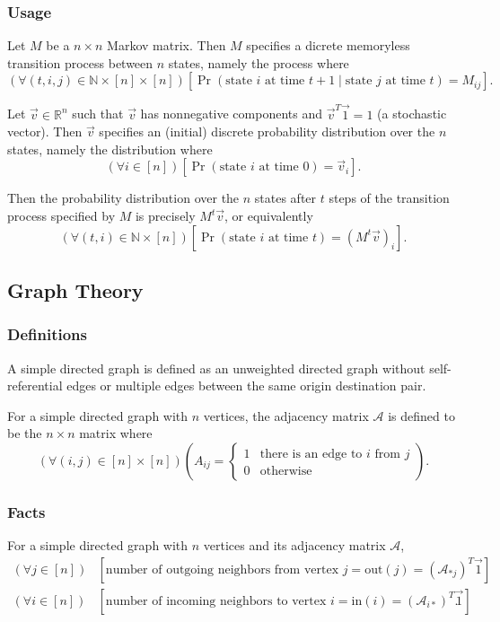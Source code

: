 \documentclass[12pt, titlepage, twoside]{amsart}
\newcommand{\R}{\ensuremath{\mathbb R}}
\newcommand{\N}{\ensuremath{\mathbb N}}
\begin{document}
\subsubsection{Usage}

Let $M$ be a $n\times n$ Markov matrix.
Then $M$ specifies a dicrete memoryless transition process between $n$ states, namely the process where
\[
  \left(\forall (t, i, j)\in\N\times[n]\times[n]\right)
  \left[\Pr(\text{state }i\text{ at time }t + 1\mid \text{state }j\text{ at time }t) = M_{ij}\right].
\]

Let $\vec{v}\in\R^n$ such that $\vec{v}$ has nonnegative components and $\vec{v}^T\vec{1} = 1$ (a stochastic vector).
Then $\vec{v}$ specifies an (initial) discrete probability distribution over the $n$ states, namely the distribution where
\[
  (\forall i\in[n])
  [\Pr(\text{state }i\text{ at time }0) = \vec{v}_i].
\]

Then the probability distribution over the $n$ states after $t$ steps of the transition process specified by $M$ is precisely $M^t\vec{v}$,
or equivalently
\[
  (\forall (t, i)\in\N\times[n])
  \left[\Pr(\text{state }i\text{ at time }t) = \left(M^t\vec{v}\right)_i\right].
\]

\subsection{Graph Theory}

\subsubsection{Definitions}

A simple directed graph is defined as an unweighted directed graph without self-referential edges or multiple edges
between the same origin destination pair.

For a simple directed graph with $n$ vertices, the adjacency matrix $\mathcal{A}$ is defined to be
the $n\times n$ matrix where
\[
  (\forall (i, j)\in[n]\times[n])\left(A_{ij} = 
    \begin{cases}
      1 & \text{there is an edge to $i$ from $j$} \\
      0 & \text{otherwise}
    \end{cases}
  \right).
\]

\subsubsection{Facts}

For a simple directed graph with $n$ vertices and its adjacency matrix $\mathcal{A}$,
\begin{align*}
  (\forall j\in[n])&
  \left[\text{number of outgoing neighbors from vertex $j$} = \mathrm{out}(j) = (\mathcal{A}_{*j})^T\vec{1}\right] \\
  (\forall i\in[n])&
  \left[\text{number of incoming neighbors to vertex $i$} = \mathrm{in}(i) = (\mathcal{A}_{i*})^T\vec{1}\right].
\end{align*}
\end{document}
